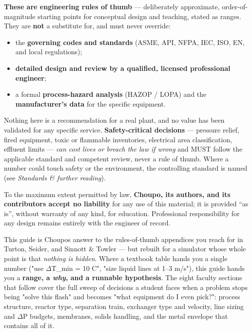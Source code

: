 \documentclass[11pt,a4paper]{article}
\title{}\author{}\date{}
\begin{document}
\thispagestyle{empty}
\vspace*{0.6cm}
\begin{tcolorbox}[colback=lightgray,colframe=black,boxrule=1.2pt,arc=2pt,left=12pt,right=12pt,top=10pt,bottom=10pt,title={\bfseries\sffamily\large Disclaimer \& scope --- read before using any number in this guide}]
\small
\textbf{These are engineering rules of thumb} --- deliberately approximate, order-of-magnitude starting points for conceptual design and teaching, stated as ranges. They are \textbf{not} a substitute for, and must never override:
\begin{itemize}\setlength\itemsep{1pt}
\item the \textbf{governing codes and standards} (ASME, API, NFPA, IEC, ISO, EN, and local regulations);
\item \textbf{detailed design and review by a qualified, licensed professional engineer};
\item a formal \textbf{process-hazard analysis} (HAZOP / LOPA) and the \textbf{manufacturer's data} for the specific equipment.
\end{itemize}
Nothing here is a recommendation for a real plant, and no value has been validated for any specific service. \textbf{Safety-critical decisions} --- pressure relief, fired equipment, toxic or flammable inventories, electrical area classification, effluent limits --- \emph{can cost lives or breach the law if wrong} and MUST follow the applicable standard and competent review, never a rule of thumb. Where a number could touch safety or the environment, the controlling standard is named (see \emph{Standards \& further reading}).

\medskip
To the maximum extent permitted by law, \textbf{Choupo, its authors, and its contributors accept no liability} for any use of this material; it is provided ``as is'', without warranty of any kind, for education. Professional responsibility for any design remains entirely with the engineer of record.
\end{tcolorbox}
\clearpage
{}\setcounter{tocdepth}{2}\tableofcontents
\clearpage{}

This guide is Choupo\textquotesingle s answer to the rules-of-thumb
appendices you reach for in Turton, Seider, and Sinnott \& Towler ---
but rebuilt for a simulator whose whole point is that \emph{nothing is
hidden}. Where a textbook table hands you a single number ("use \(\Delta\)T\_min
= 10 \textdegree{}C", "size liquid lines at 1--3 m/s"), this guide hands you a
\textbf{range, a \emph{why}, and a runnable hypothesis}. The eight
faculty sections that follow cover the full sweep of decisions a student
faces when a problem stops being "solve this flash" and becomes "what
equipment do I even pick?": process structure, reactor type, separation
train, exchanger type and velocity, line sizing and \(\Delta\)P budgets,
membranes, solids handling, and the metal envelope that contains all of
it.
\end{document}
